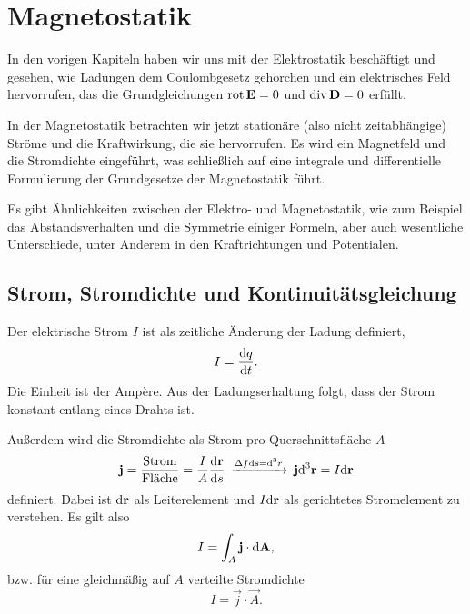 \chapter{Magnetostatik}


In den vorigen Kapiteln haben wir uns mit der Elektrostatik beschäftigt und gesehen, wie Ladungen dem Coulombgesetz gehorchen und ein elektrisches Feld hervorrufen, das die Grundgleichungen $\operatorname{rot} \mathbf{E}=0$ und $\operatorname{div} \mathbf{D}=0$ erfüllt.

In der Magnetostatik betrachten wir jetzt stationäre (also nicht zeitabhängige) Ströme und die Kraftwirkung, die sie hervorrufen. Es wird ein Magnetfeld und die Stromdichte eingeführt, was schließlich auf eine integrale und differentielle Formulierung der Grundgesetze der Magnetostatik führt.

Es gibt Ähnlichkeiten zwischen der Elektro- und Magnetostatik, wie zum Beispiel das Abstandsverhalten und die Symmetrie einiger Formeln, aber auch wesentliche Unterschiede, unter Anderem in den Kraftrichtungen und Potentialen.

\section{Strom, Stromdichte und Kontinuitätsgleichung}

Der elektrische Strom $I$ ist als zeitliche Änderung der Ladung definiert,
\begin{equation*}
	I=\frac{\text{d} q}{\text{d} t}.
\end{equation*}
Die Einheit ist der Ampère. Aus der Ladungserhaltung folgt, dass der Strom konstant entlang eines Drahts ist.

Außerdem wird die Stromdichte als Strom pro Querschnittsfläche $A$
\begin{equation*}
	\mathbf{j}=\frac{\text{Strom}}{\text{Fläche}}=\frac{I}{A}\frac{\text{d} \mathbf{\mathbf{r}}}{\text{d} s}\:\xrightarrow{\Delta  f\text{d} s=\text{d} ^{3}r}\: \mathbf{j}\text{d} ^{3}\mathbf{r}=I\text{d} \mathbf{r}
\end{equation*}
definiert. Dabei ist $\text{d}\mathbf{r}$ als Leiterelement und $I\text{d}\mathbf{r}$ als gerichtetes Stromelement zu verstehen. Es gilt also 
\begin{equation*}
    I=\int_A \mathbf{j} \cdot \text{d} \mathbf{A},
\end{equation*}
bzw. für eine gleichmäßig auf $A$ verteilte Stromdichte
\begin{equation*}
    I=\vec j\cdot \vec A.
\end{equation*}

